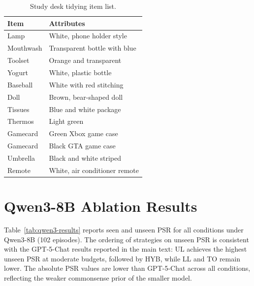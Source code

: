 \documentclass[manuscript,review,anonymous]{acmart}
\begin{document}
\begin{table}[h]
\centering
\begin{tabular}{ll}
\toprule
\textbf{Item} & \textbf{Attributes} \\
\midrule
Lamp & White, phone holder style \\
Mouthwash & Transparent bottle with blue \\
Toolset & Orange and transparent \\
Yogurt & White, plastic bottle \\
Baseball & White with red stitching \\
Doll & Brown, bear-shaped doll \\
Tissues & Blue and white package \\
Thermos & Light green \\
Gamecard & Green Xbox game case \\
Gamecard & Black GTA game case \\
Umbrella & Black and white striped \\
Remote & White, air conditioner remote \\
\bottomrule
\end{tabular}
\caption{Study desk tidying item list.}
\end{table}

\section{Qwen3-8B Ablation Results}
\label{app:qwen3}
Table~\ref{tab:qwen3-results} reports seen and unseen PSR for all conditions under Qwen3-8B (102 episodes). The ordering of strategies on unseen PSR is consistent with the GPT-5-Chat results reported in the main text: UL achieves the highest unseen PSR at moderate budgets, followed by HYB, while LL and TO remain lower. The absolute PSR values are lower than GPT-5-Chat across all conditions, reflecting the weaker commonsense prior of the smaller model.
\end{document}
